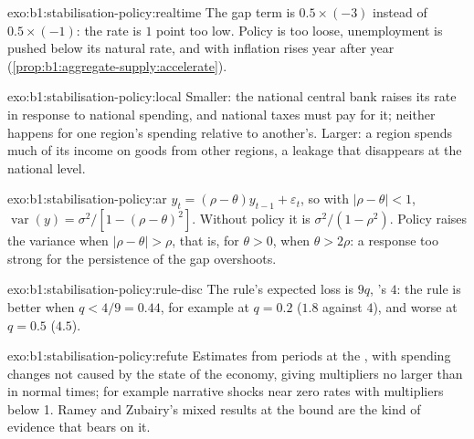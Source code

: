\begin{solution}{exo:b1:stabilisation-policy:realtime}
The gap term is $0.5 \times (-3)$ instead of $0.5 \times (-1)$: the rate is $1$ point too low. Policy
is too loose, unemployment is pushed below its natural rate, and with
 inflation rises year after year
(\cref{prop:b1:aggregate-supply:accelerate}).
\end{solution}

\begin{solution}{exo:b1:stabilisation-policy:local}
Smaller: the national central bank raises its rate in response to national
spending, and national taxes must pay for it; neither happens for one
region's spending relative to another's. Larger: a region spends much of
its income on goods from other regions, a leakage that disappears at the
national level.
\end{solution}

\begin{solution}{exo:b1:stabilisation-policy:ar}
$y_t = (\rho - \theta)y_{t-1} + \varepsilon_t$, so with $|\rho - \theta| < 1$, $\operatorname{var}(y) = \sigma^2/[1 - (\rho - \theta)^2]$. Without
policy it is $\sigma^2/(1 - \rho^2)$. Policy raises the variance when $|\rho - \theta| > \rho$, that is,
for $\theta > 0$, when $\theta > 2\rho$: a response too strong for the persistence of the gap
overshoots.
\end{solution}

\begin{solution}{exo:b1:stabilisation-policy:rule-disc}
The rule's expected loss is $9q$, 's $4$: the rule is better when
$q < 4/9 = 0.44$, for example at $q = 0.2$ ($1.8$ against $4$), and worse at $q = 0.5$ ($4.5$).
\end{solution}

\begin{solution}{exo:b1:stabilisation-policy:refute}
Estimates from periods at the , with spending changes
not caused by the state of the economy, giving multipliers no larger than
in normal times; for example narrative shocks near zero rates with
multipliers below 1. Ramey and Zubairy's mixed results at the bound are
the kind of evidence that bears on it.
\end{solution}

